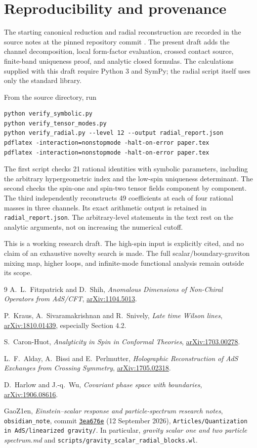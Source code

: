 \documentclass[11pt,a4paper]{article}
\numberwithin{equation}{section}
\theoremstyle{remark}\newtheorem{remark}[theorem]{Remark}
\newcommand{\arxiv}[1]{\href{https://arxiv.org/abs/#1}{arXiv:#1}}
\begin{document}
\section{Reproducibility and provenance}

The starting canonical reduction and radial reconstruction are recorded in the source notes at the pinned repository commit \cite{notes}. The present draft adds the channel decomposition, local form-factor evaluation, crossed contact source, finite-band uniqueness proof, and analytic closed formulas. The calculations supplied with this draft require Python 3 and SymPy; the radial script itself uses only the standard library.

From the source directory, run
\begin{verbatim}
python verify_symbolic.py
python verify_tensor_modes.py
python verify_radial.py --level 12 --output radial_report.json
pdflatex -interaction=nonstopmode -halt-on-error paper.tex
pdflatex -interaction=nonstopmode -halt-on-error paper.tex
\end{verbatim}
The first script checks 21 rational identities with symbolic parameters, including the arbitrary hypergeometric index and the low-spin uniqueness determinant. The second checks the spin-one and spin-two tensor fields component by component. The third independently reconstructs 49 coefficients at each of four rational masses in three channels. Its exact arithmetic output is retained in \texttt{radial\_report.json}. The arbitrary-level statements in the text rest on the analytic arguments, not on increasing the numerical cutoff.

This is a working research draft. The high-spin input is explicitly cited, and no claim of an exhaustive novelty search is made. The full scalar/boundary-graviton mixing map, higher loops, and infinite-mode functional analysis remain outside its scope.

\begin{thebibliography}{9}
A.~L.~Fitzpatrick and D.~Shih,
\emph{Anomalous Dimensions of Non-Chiral Operators from AdS/CFT},
\arxiv{1104.5013}.

P.~Kraus, A.~Sivaramakrishnan and R.~Snively,
\emph{Late time Wilson lines},
\arxiv{1810.01439}, especially Section 4.2.

S.~Caron-Huot,
\emph{Analyticity in Spin in Conformal Theories},
\arxiv{1703.00278}.

L.~F.~Alday, A.~Bissi and E.~Perlmutter,
\emph{Holographic Reconstruction of AdS Exchanges from Crossing Symmetry},
\arxiv{1705.02318}.

D.~Harlow and J.-q.~Wu,
\emph{Covariant phase space with boundaries},
\arxiv{1906.08616}.

GaoZ1en, \emph{Einstein--scalar response and particle-spectrum research notes},
\texttt{obsidian\_note}, commit
\href{https://github.com/GaoZ1en/obsidian_note/commit/3ea676ef5a43cd11a18f551b0adcac222abc8b9a}{\texttt{3ea676e}} (12 September 2026),
\texttt{Articles/Quantization in AdS/linearized gravity/}.
In particular, \emph{gravity scalar one and two particle spectrum.md} and
\texttt{scripts/gravity\_scalar\_radial\_blocks.wl}.
\end{thebibliography}
\end{document}
